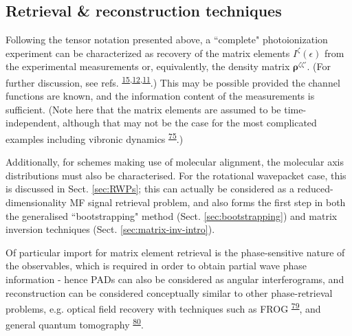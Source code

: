 \documentclass[10pt]{article}
\begin{document}






\subsection{Retrieval \& reconstruction techniques\label{sec:recon-techniques-intro}}


Following the tensor notation presented above, a ``complete" photoionization experiment can be characterized as recovery of the matrix elements $I^{\zeta}(\epsilon)$ from the experimental measurements or, equivalently, the density matrix $\mathbf{\rho}^{\zeta\zeta'}$. (For further discussion, see refs. \textsuperscript{\hyperref[csl:15]{15},\hyperref[csl:12]{12},\hyperref[csl:11]{11}}.) This may be possible provided the channel functions are known, and the information content of the measurements is sufficient. (Note here that the matrix elements are assumed to be time-independent, although that may not be the case for the most complicated examples including vibronic dynamics \textsuperscript{\hyperref[csl:75]{75}}.) 

Additionally, for schemes making use of molecular alignment, the molecular axis distributions must also be characterised. For the rotational wavepacket case, this is discussed in Sect. \ref{sec:RWPs}; this can actually be considered as a reduced-dimensionality MF signal retrieval problem, and also forms the first step in both the generalised ``bootstrapping" method (Sect. \ref{sec:bootstrapping}) and matrix inversion techniques (Sect. \ref{sec:matrix-inv-intro}).

Of particular import for matrix element retrieval is the phase-sensitive nature of the observables, which is required in order to obtain partial wave phase information - hence PADs can also be considered as angular interferograms, and reconstruction can be considered conceptually similar to other phase-retrieval problems, e.g. optical field recovery with techniques such as FROG \textsuperscript{\hyperref[csl:79]{79}}, and general quantum tomography \textsuperscript{\hyperref[csl:80]{80}}. 
\end{document}
